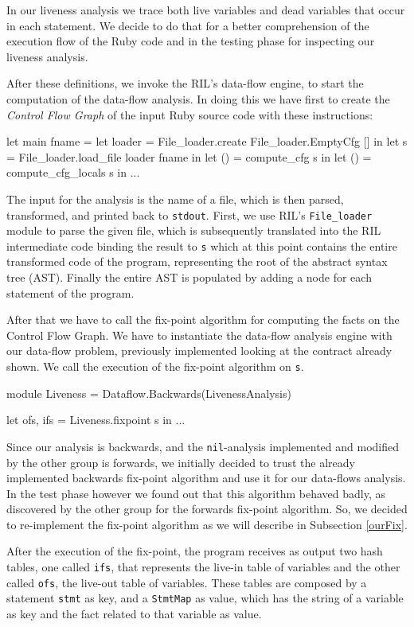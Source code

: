 \documentclass[a4paper]{article}   %
\begin{document}
In our liveness analysis we trace both live variables and dead variables that occur in each statement. We decide to do that for a better comprehension of the execution flow of the Ruby code and in the testing phase for inspecting our liveness analysis. 

After these definitions, we invoke the RIL's data-flow engine, to start the computation of the data-flow analysis. In doing this we have first to create the \emph{Control Flow Graph} of the input Ruby source code with these instructions:
\begin{ocaml}
let main fname =
 let loader = File_loader.create File_loader.EmptyCfg [] in
 let s = File_loader.load_file loader fname in
 let () = compute_cfg s in
 let () = compute_cfg_locals s in
 ...
\end{ocaml}

The input for the analysis is the name of a file, which is then parsed, transformed, and printed back to \texttt{stdout}. First, we use RIL's \texttt{File\_loader} module to parse the given file, which is subsequently translated into the RIL intermediate code binding the result to \texttt{s} which at this point contains the entire transformed code of the program, representing the root of the abstract syntax tree (AST). Finally the entire AST is populated by adding a node for each statement of the program.

After that we have to call the fix-point algorithm for computing the facts on the Control Flow Graph. We have to instantiate the data-flow analysis engine with our data-flow problem, previously implemented looking at the contract already shown. We call the execution of the fix-point algorithm on \texttt{s}.

\begin{ocaml}
module Liveness = Dataflow.Backwards(LivenessAnalysis)

    let ofs, ifs = Liveness.fixpoint s in
...
\end{ocaml}

Since our analysis is backwards, and the \texttt{nil}-analysis implemented and modified by the other group is forwards, we initially decided to trust the already implemented backwards fix-point algorithm and use it for our data-flows analysis. In the test phase however we found out that this algorithm behaved badly, as discovered by the other group for the forwards fix-point algorithm. So, we decided to re-implement the fix-point algorithm as we will describe in Subsection \ref{ourFix}.

After the execution of the fix-point, the program receives as output two hash tables, one called \texttt{ifs}, that represents the live-in table of variables and the other called \texttt{ofs}, the live-out table of variables. These tables are composed by a statement \texttt{stmt} as key, and a \texttt{StmtMap} as value, which has the string of a variable as key and the fact related to that variable as value.
\end{document}
